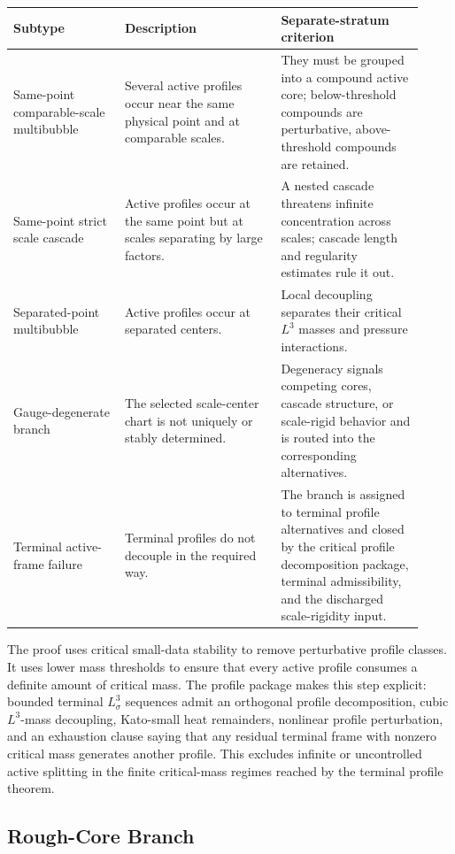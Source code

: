 \documentclass[11pt]{amsart}
\begin{document}
\begin{longtable}{@{}>{\raggedright\arraybackslash}p{0.25\linewidth}>{\raggedright\arraybackslash}p{0.35\linewidth}>{\raggedright\arraybackslash}p{0.32\linewidth}@{}}
\toprule
\textbf{Subtype} & \textbf{Description} & \textbf{Separate-stratum criterion} \\
\midrule
\endhead
Same-point comparable-scale multibubble & Several active profiles occur near the same physical point and at comparable scales. & They must be grouped into a compound active core; below-threshold compounds are perturbative, above-threshold compounds are retained. \\
Same-point strict scale cascade & Active profiles occur at the same point but at scales separating by large factors. & A nested cascade threatens infinite concentration across scales; cascade length and regularity estimates rule it out. \\
Separated-point multibubble & Active profiles occur at separated centers. & Local decoupling separates their critical \(L^3\) masses and pressure interactions. \\
Gauge-degenerate branch & The selected scale-center chart is not uniquely or stably determined. & Degeneracy signals competing cores, cascade structure, or scale-rigid behavior and is routed into the corresponding alternatives. \\
Terminal active-frame failure & Terminal profiles do not decouple in the required way. & The branch is assigned to terminal profile alternatives and closed by the critical profile decomposition package, terminal admissibility, and the discharged scale-rigidity input. \\
\bottomrule
\end{longtable}

The proof uses critical small-data stability to remove perturbative profile classes.  It uses lower mass thresholds to ensure that every active profile consumes a definite amount of critical mass.  The profile package makes this step explicit: bounded terminal \(L^3_\sigma\) sequences admit an orthogonal profile decomposition, cubic \(L^3\)-mass decoupling, Kato-small heat remainders, nonlinear profile perturbation, and an exhaustion clause saying that any residual terminal frame with nonzero critical mass generates another profile.  This excludes infinite or uncontrolled active splitting in the finite critical-mass regimes reached by the terminal profile theorem.

\subsection{Rough-Core Branch}
\end{document}
